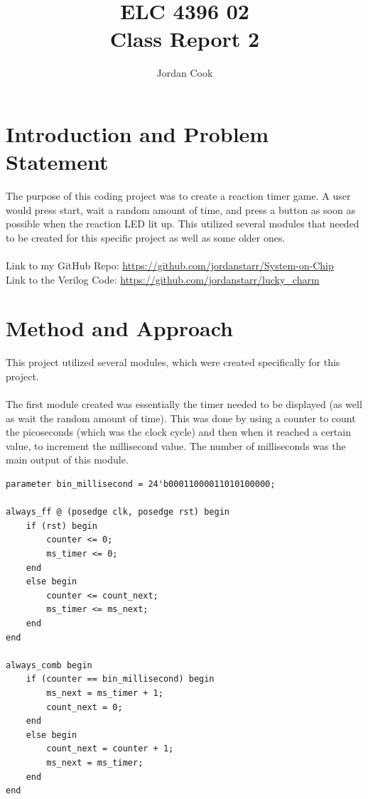 \documentclass[11pt]{article}
\begin{document}
\title{ELC 4396 02 \\ Class Report 2}
\author{Jordan Cook}

\maketitle


\section*{Introduction and Problem Statement} 

The purpose of this coding project was to create a reaction timer game. A user would press start, wait a random amount of time, and press a button as soon as possible when the reaction LED lit up. This utilized several modules that needed to be created for this specific project as well as some older ones. 
\\\\ Link to my GitHub Repo: \url{https://github.com/jordanstarr/System-on-Chip}
\\ Link to the Verilog Code: \url{https://github.com/jordanstarr/lucky_charm}

\section*{Method and Approach}

This project utilized several modules, which were created specifically for this project. 
\\\\
The first module created was essentially the timer needed to be displayed (as well as wait the random amount of time). This was done by using a counter to count the picoseconds (which was the clock cycle) and then when it reached a certain value, to increment the millisecond value. The number of milliseconds was the main output of this module. 

\begin{lstlisting}[style=Verilog,caption=Timer Module Code,label=code:ex ]
parameter bin_millisecond = 24'b00011000011010100000;

always_ff @ (posedge clk, posedge rst) begin 
	if (rst) begin
		counter <= 0; 
		ms_timer <= 0; 
	end 
	else begin
		counter <= count_next; 
		ms_timer <= ms_next;
	end   
end

always_comb begin 
	if (counter == bin_millisecond) begin 
		ms_next = ms_timer + 1; 
		count_next = 0;
	end
	else begin  
		count_next = counter + 1; 
		ms_next = ms_timer;
	end
end
\end{lstlisting}
 
\end{document}
